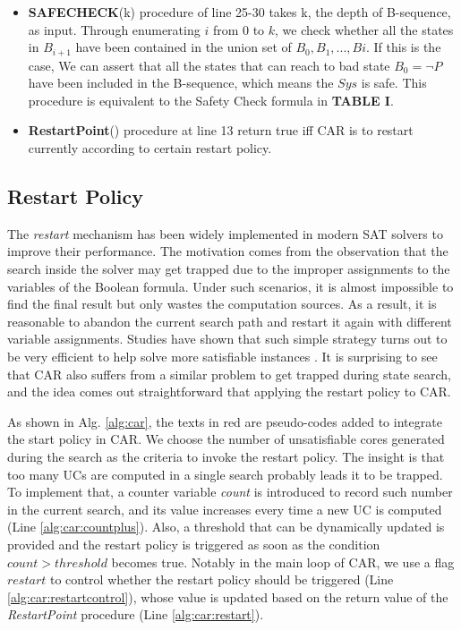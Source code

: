 \begin{itemize}
    \item \textbf{SAFECHECK}(k) procedure of line 25-30 takes k, the depth of B-sequence, as input. Through enumerating $i$ from $0$ to $k$, we check whether all the states in $B_{i+1}$ have been contained in the union set of $B_{0},B_{1},...,B{i}$. If this is the case, We can assert that all the states that can reach to bad state $B_{0}=\neg P$ have been included in the B-sequence, which means the $Sys$ is safe. This procedure is equivalent to the Safety Check formula in \textbf{TABLE I}.
    \item \textbf{RestartPoint}() procedure at line 13 return true iff CAR is to restart currently according to certain restart policy.
    \fi
\end{itemize}

\subsection{Restart Policy}

The \emph{restart} mechanism has been widely implemented in modern SAT solvers to improve their performance. The motivation comes from the observation that the search inside the solver may get trapped due to the improper assignments to the variables of the Boolean formula. Under such scenarios, it is almost impossible to find the final result  but only wastes the computation sources. As a result, it is reasonable to abandon the current search path and restart it again with different variable assignments. Studies have shown that such simple strategy turns out to be very efficient to help solve more satisfiable instances \cite{}. It is surprising to see that CAR also suffers from a similar problem to get trapped during state search, and the idea comes out straightforward that  applying the restart policy to CAR.

As shown in Alg. \ref{alg:car}, the texts in red are pseudo-codes added to integrate the start policy in CAR. We choose the number of unsatisfiable cores generated during the search as the criteria to invoke the restart policy. The insight is that too many UCs are computed in a single search probably leads it to be trapped. To implement that, a counter variable \emph{count} is introduced to record such number in the current search, and its value increases every time a new UC is computed (Line \ref{alg:car:countplus}). Also, a threshold that can be dynamically updated is provided  and the restart policy is triggered as soon as the condition $count > threshold$ becomes true. Notably in the main loop of CAR, we use a flag $restart$ to control whether the restart policy should be triggered (Line \ref{alg:car:restartcontrol}), whose value is updated based on the return value of the \emph{RestartPoint} procedure (Line \ref{alg:car:restart}).

